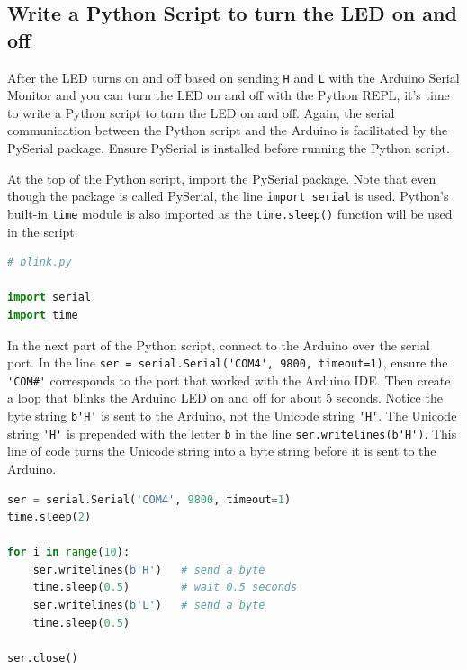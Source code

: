 \documentclass{book}
\begin{document}
    
        \subsection{Write a Python Script to turn the LED on and
off}\label{write-a-python-script-to-turn-the-led-on-and-off}
    




    
        After the LED turns on and off based on sending \lstinline!H! and
\lstinline!L! with the Arduino Serial Monitor and you can turn the LED
on and off with the Python REPL, it's time to write a Python script to
turn the LED on and off. Again, the serial communication between the
Python script and the Arduino is facilitated by the PySerial package.
Ensure PySerial is installed before running the Python script.

At the top of the Python script, import the PySerial package. Note that
even though the package is called PySerial, the line
\lstinline!import serial! is used. Python's built-in \lstinline!time!
module is also imported as the \lstinline!time.sleep()! function will be
used in the script.
    




    
        \begin{lstlisting}[language=Python]
# blink.py

import serial
import time
\end{lstlisting}
    




    
        In the next part of the Python script, connect to the Arduino over the
serial port. In the line
\lstinline!ser = serial.Serial('COM4', 9800, timeout=1)!, ensure the
\lstinline!'COM#'! corresponds to the port that worked with the Arduino
IDE. Then create a loop that blinks the Arduino LED on and off for about
5 seconds. Notice the byte string \lstinline!b'H'! is sent to the
Arduino, not the Unicode string \lstinline!'H'!. The Unicode string
\lstinline!'H'! is prepended with the letter \lstinline!b! in the line
\lstinline!ser.writelines(b'H')!. This line of code turns the Unicode
string into a byte string before it is sent to the Arduino.
    




    
        \begin{lstlisting}[language=Python]
ser = serial.Serial('COM4', 9800, timeout=1)
time.sleep(2)

for i in range(10):
    ser.writelines(b'H')   # send a byte
    time.sleep(0.5)        # wait 0.5 seconds
    ser.writelines(b'L')   # send a byte
    time.sleep(0.5)

ser.close()
\end{lstlisting}
    
\end{document}
